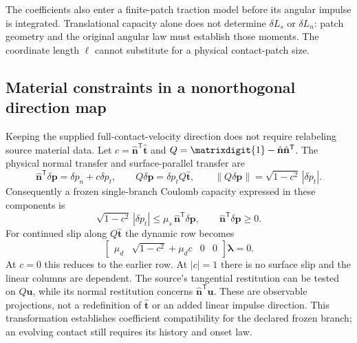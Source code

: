 \documentclass[11pt,a4paper]{article}
\newcommand{\id}{\matrixdigit{1}}
\begin{document}
The coefficients also enter a finite-patch traction model before its angular impulse is integrated. Translational capacity alone does not determine $\delta L_s$ or $\delta L_n$: patch geometry and the original angular law must establish those moments. The coordinate length $\ell$ cannot substitute for a physical contact-patch size.

\subsection{Material constraints in a nonorthogonal direction map}
Keeping the supplied full-contact-velocity direction does not require relabeling source material data. Let $c=\hat{\mathbf n}^{\mathsf T}\hat{\mathbf t}$ and $Q=\id-\hat{\mathbf n}\hat{\mathbf n}^{\mathsf T}$. The physical normal transfer and surface-parallel transfer are
\begin{equation}
 \hat{\mathbf n}^{\mathsf T}\delta\mathbf p=\delta p_n+c\delta p_t,\qquad
 Q\delta\mathbf p=\delta p_t Q\hat{\mathbf t},\qquad
 \|Q\delta\mathbf p\|=\sqrt{1-c^2}\,|\delta p_t|.
\end{equation}
Consequently a frozen single-branch Coulomb capacity expressed in these components is
\begin{equation}
 \sqrt{1-c^2}\,|\delta p_t|\le\mu_s\,\hat{\mathbf n}^{\mathsf T}\delta\mathbf p,
 \qquad\hat{\mathbf n}^{\mathsf T}\delta\mathbf p\ge0.
\end{equation}
For continued slip along $Q\hat{\mathbf t}$ the dynamic row becomes
\begin{equation}
 \begin{bmatrix}\mu_d&\sqrt{1-c^2}+\mu_dc&0&0\end{bmatrix}
 \boldsymbol\lambda=0.
\end{equation}
At $c=0$ this reduces to the earlier row. At $|c|=1$ there is no surface slip and the linear columns are dependent. The source's tangential restitution can be tested on $Q\mathbf u$, while its normal restitution concerns $\hat{\mathbf n}^{\mathsf T}\mathbf u$. These are observable projections, not a redefinition of $\hat{\mathbf t}$ or an added linear impulse direction. This transformation establishes coefficient compatibility for the declared frozen branch; an evolving contact still requires its history and onset law.
\end{document}
